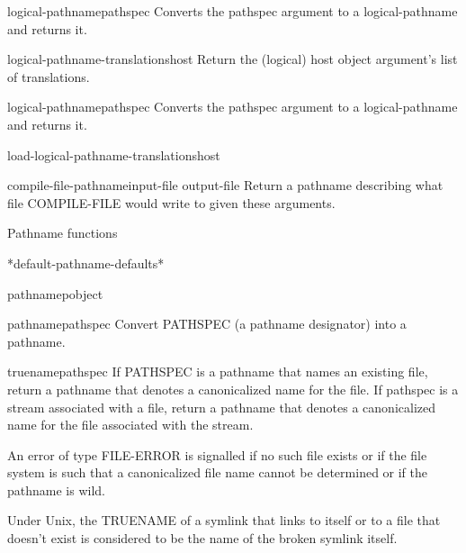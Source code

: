 \documentclass[10pt,english]{book}
\begin{document}
\begin{class}{logical-pathname}{pathspec}
  Converts the pathspec argument to a logical-pathname and returns it.
\end{class}

\begin{accessor}{logical-pathname-translations}{host}
  Return the (logical) host object argument's list of translations.
\end{accessor}

\begin{function}{logical-pathname}{pathspec}
  Converts the pathspec argument to a logical-pathname and returns it.
\end{function}

\begin{function}{load-logical-pathname-translations}{host}
  
\end{function}

\begin{function}{compile-file-pathname}{input-file \key output-file \akeys}
  Return a pathname describing what file COMPILE-FILE would write to given
   these arguments.
\end{function}

Pathname functions

\begin{variable}{*default-pathname-defaults*}{}
  
\end{variable}

\begin{function}{pathnamep}{object}
  
\end{function}

\begin{function}{pathname}{pathspec}
  Convert PATHSPEC (a pathname designator) into a pathname.
\end{function}

\begin{function}{truename}{pathspec}
  If PATHSPEC is a pathname that names an existing file, return
a pathname that denotes a canonicalized name for the file.  If
pathspec is a stream associated with a file, return a pathname
that denotes a canonicalized name for the file associated with
the stream.

An error of type FILE-ERROR is signalled if no such file exists
or if the file system is such that a canonicalized file name
cannot be determined or if the pathname is wild.

Under Unix, the TRUENAME of a symlink that links to itself or to
a file that doesn't exist is considered to be the name of the
broken symlink itself.
\end{function}
\end{document}
